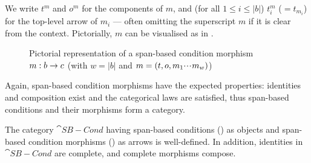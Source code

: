 %
\begin{center}

\end{center}
%
We write $t^m$ and $o^m$ for the components of $m$, and (for all $1\leq i\leq |b|$) $t^m_i$ ($=t_{m_i}$) for the top-level arrow of $m_i$ --- often omitting the superscript $m$ if it is clear from the context. Pictorially, $m$ can be visualised as in .
%
\begin{figure}
  \centering
  
  \caption{Pictorial representation of a span-based condition morphism $m:b\rightarrow c$ (with $w=|b|$ and $m=(t,o,m_1{\cdotp\mkern-2mu\cdotp\mkern-2mu\cdotp\mkern1mu} m_w)$)}
\end{figure}
%

\medskip\noindent Again, span-based condition morphisms have the expected properties: identities and composition exist and the categorical laws are satisfied, thus span-based conditions and their morphisms form a category.

\begin{proposition}
  The category $\cat{SB-Cond}$ having span-based conditions () as objects and span-based condition morphisms () as arrows is well-defined. In addition, identities in $\cat{SB-Cond}$ are complete, and complete morphisms compose.
\end{proposition}
 
